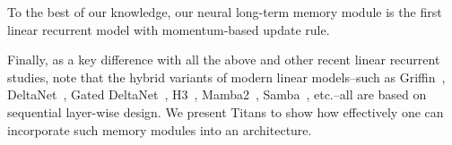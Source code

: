 To the best of our knowledge, our neural long-term memory module is the first linear recurrent model with momentum-based update rule. 


Finally, as a key difference with all the above and other recent linear recurrent studies, note that the hybrid variants of modern linear models–such as Griffin~\citep{de2024griffin}, DeltaNet~\citep{yang2024parallelizing}, Gated DeltaNet~\citep{yang2024gated}, H3~\citep{fu2023hungry}, Mamba2~\citep{dao2024transformers}, Samba~\citep{ren2024samba}, etc.–all are based on sequential layer-wise design. We present Titans to show how effectively one can incorporate such memory modules into an architecture.